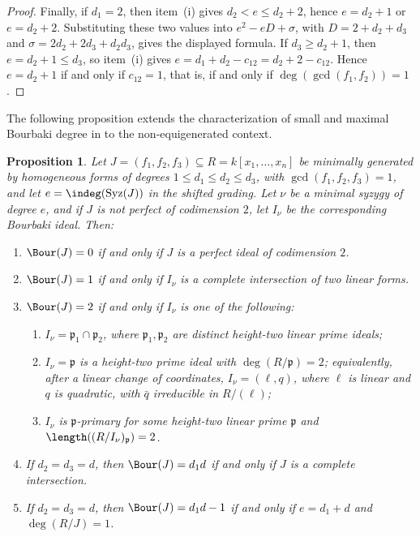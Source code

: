 \documentclass[11pt]{amsart} %
\newtheorem{Proposition}[Theorem]{Proposition}
\theoremstyle{definition}
\def\syz{\mbox{\rm Syz}}
\def\fp{{\mathfrak p}}
\begin{document}
\begin{proof}
Finally, if $d_1=2$, then item~\rm(i) gives $d_2<e\le d_2+2$, hence $e=d_2+1$ or $e=d_2+2$. Substituting these two values into $e^2-eD+\sigma$, with $D=2+d_2+d_3$ and $\sigma=2d_2+2d_3+d_2d_3$, gives the displayed formula. If $d_3\ge d_2+1$, then $e=d_2+1\le d_3$, so item~\rm(i) gives $e=d_1+d_2-c_{12}=d_2+2-c_{12}$. Hence $e=d_2+1$ if and only if $c_{12}=1$, that is, if and only if $\deg(\gcd(f_1,f_2))=1$.
\end{proof}

The following proposition extends the characterization of small and maximal Bourbaki degree in \cite[Theorem 3.2]{MFA} to the non-equigenerated context.

\begin{Proposition}\label{prop:not-equigen-Bour-consequences}
Let $J=(f_1,f_2,f_3)\subseteq R=k[x_1,\ldots,x_n]$ be minimally generated by homogeneous forms of degrees $1\le d_1\le d_2\le d_3$, with $\gcd(f_1,f_2,f_3)=1$, and let $e=\indeg(\syz(J))$ in the shifted grading. Let $\nu$ be a minimal syzygy of degree $e$, and if $J$ is not perfect of codimension $2$, let $I_\nu$ be the corresponding Bourbaki ideal. Then:
\begin{enumerate}
\item[\rm(i)] $\Bour(J)=0$ if and only if $J$ is a perfect ideal of codimension $2$.
\item[\rm(ii)] $\Bour(J)=1$ if and only if $I_\nu$ is a complete intersection of two linear forms.
\item[\rm(iii)] $\Bour(J)=2$ if and only if $I_\nu$ is one of the following:
\begin{enumerate}
\item[\rm(a)] $I_\nu=\fp_1\cap\fp_2$, where $\fp_1,\fp_2$ are distinct height-two linear prime ideals;
\item[\rm(b)] $I_\nu=\fp$ is a height-two prime ideal with $\deg(R/\fp)=2$; equivalently, after a linear change of coordinates, $I_\nu=(\ell,q)$, where $\ell$ is linear and $q$ is quadratic, with $\bar q$ irreducible in $R/(\ell)$;
\item[\rm(c)] $I_\nu$ is $\fp$-primary for some height-two linear prime $\fp$ and $\length((R/I_\nu)_\fp)=2$.
\end{enumerate}
\item[\rm(iv)] If $d_2=d_3=d$, then $\Bour(J)=d_1d$ if and only if $J$ is a complete intersection.
\item[\rm(v)] If $d_2=d_3=d$, then $\Bour(J)=d_1d-1$ if and only if $e=d_1+d$ and $\deg(R/J)=1$.
\end{enumerate}
\end{Proposition}
\end{document}
